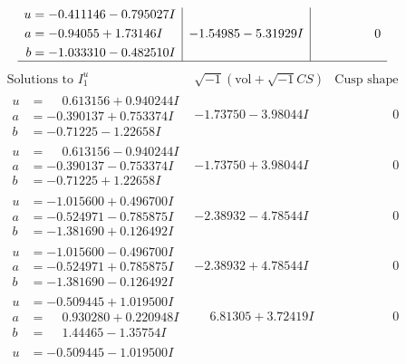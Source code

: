 \documentclass[1p]{elsarticle_modified}
\theoremstyle{definition}
\newcommand{\I}{\sqrt{-1}}
\begin{document}
$$\begin{array}{c|c|c}
\begin{aligned}
u &= -0.411146 - 0.795027 I \\
a &= -0.94055 + 1.73146 I \\
b &= -1.033310 - 0.482510 I\end{aligned}
 & -1.54985 - 5.31929 I & \phantom{-0.000000 } 0\\
 \hline 
 \end{array}$$\newpage$$\begin{array}{c|c|c}  
\text{Solutions to }I^u_{1}& \I (\text{vol} + \sqrt{-1}CS) & \text{Cusp shape}\\
 \hline 
\begin{aligned}
u &= \phantom{-}0.613156 + 0.940244 I \\
a &= -0.390137 + 0.753374 I \\
b &= -0.71225 - 1.22658 I\end{aligned}
 & -1.73750 - 3.98044 I & \phantom{-0.000000 } 0 \\ \hline\begin{aligned}
u &= \phantom{-}0.613156 - 0.940244 I \\
a &= -0.390137 - 0.753374 I \\
b &= -0.71225 + 1.22658 I\end{aligned}
 & -1.73750 + 3.98044 I & \phantom{-0.000000 } 0 \\ \hline\begin{aligned}
u &= -1.015600 + 0.496700 I \\
a &= -0.524971 - 0.785875 I \\
b &= -1.381690 + 0.126492 I\end{aligned}
 & -2.38932 - 4.78544 I & \phantom{-0.000000 } 0 \\ \hline\begin{aligned}
u &= -1.015600 - 0.496700 I \\
a &= -0.524971 + 0.785875 I \\
b &= -1.381690 - 0.126492 I\end{aligned}
 & -2.38932 + 4.78544 I & \phantom{-0.000000 } 0 \\ \hline\begin{aligned}
u &= -0.509445 + 1.019500 I \\
a &= \phantom{-}0.930280 + 0.220948 I \\
b &= \phantom{-}1.44465 - 1.35754 I\end{aligned}
 & \phantom{-}6.81305 + 3.72419 I & \phantom{-0.000000 } 0 \\ \hline\begin{aligned}
u &= -0.509445 - 1.019500 I \\

\end{aligned}
\end{array}$$
\end{document}
